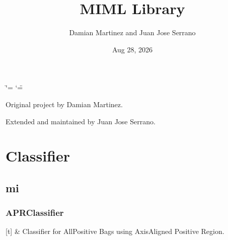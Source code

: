 \documentclass[letterpaper,10pt,english]{sphinxmanual}
\title{MIML Library}
\date{Aug 28, 2026}
\author{Damian Martinez and Juan Jose Serrano}
\begin{document}
\ifdefined\shorthandoff
  \ifnum\catcode`\=\string=\active\shorthandoff{=}\fi
  \ifnum\catcode`\"=\active{}\fi
\fi

\pagestyle{empty}
\sphinxmaketitle
\pagestyle{plain}
\sphinxtableofcontents
\pagestyle{normal}
\label{\detokenize{miml::doc}}


\sphinxAtStartPar
Original project by Damian Martinez.

\sphinxAtStartPar
Extended and maintained by Juan Jose Serrano.

\sphinxstepscope


\chapter{Classifier}
\label{\detokenize{classifier/index:classifier}}\label{\detokenize{classifier/index::doc}}
\sphinxstepscope


\section{mi}
\label{\detokenize{classifier/mi/index:mi}}\label{\detokenize{classifier/mi/index::doc}}
\sphinxstepscope


\subsection{APRClassifier}
\label{\detokenize{classifier/mi/apr_classifier:aprclassifier}}\label{\detokenize{classifier/mi/apr_classifier::doc}}

\begin{savenotes}\sphinxattablestart
\sphinxthistablewithglobalstyle
\sphinxthistablewithnovlinesstyle
\centering
\begin{tabulary}{\linewidth}[t]{}
\sphinxtoprule
\sphinxtableatstartofbodyhook
\sphinxAtStartPar
{\hyperref[\detokenize{classifier/mi/_autosummary/miml.classifier.mi.apr_classifier.APRClassifier:miml.classifier.mi.apr_classifier.APRClassifier}]{}}
&
\sphinxAtStartPar
Classifier for All\sphinxhyphen{}Positive Bags using Axis\sphinxhyphen{}Aligned Positive Region.
\\
\sphinxbottomrule
\end{tabulary}
\sphinxtableafterendhook\par
\sphinxattableend\end{savenotes}

\sphinxstepscope
\end{document}
